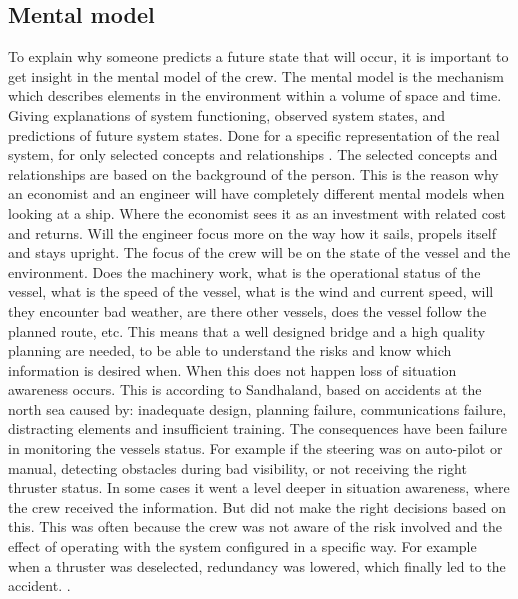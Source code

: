 \subsection{Mental model}
To explain why someone predicts a future state that will occur, it is important to get insight in the mental model of the crew.
The mental model is the mechanism which describes elements in the environment within a volume of space and time. Giving explanations of system functioning, observed system states, and predictions of future system states. Done for a specific representation of the real system, for only selected concepts and relationships \cite{Kalloniatis2017}. 
The selected concepts and relationships are based on the background of the person. This is the reason why an economist and an engineer will have completely different mental models when looking at a ship. Where the economist sees it as an investment with related cost and returns. Will the engineer focus more on the way how it sails, propels itself and stays upright. 
The focus of the crew will be on the state of the vessel and the environment. Does the machinery work, what is the operational status of the vessel, what is the speed of the vessel, what is the wind and current speed, will they encounter bad weather, are there other vessels, does the vessel follow the planned route, etc. This means that a well designed bridge and a high quality planning are needed, to be able to understand the risks and know which information is desired when. 
When this does not happen loss of situation awareness occurs. This is according to Sandhaland, based on accidents at the north sea caused by: inadequate design, planning failure, communications failure, distracting elements and insufficient training. 
The consequences have been failure in monitoring the vessels status. For example if the steering was on auto-pilot or manual, detecting obstacles during bad visibility, or not receiving the right thruster status. In some cases it went a level deeper in situation awareness, where the crew received the information. But did not make the right decisions based on this. This was often because the crew was not aware of the risk involved and the effect of operating with the system configured in a specific way. For example when a thruster was deselected, redundancy was lowered, which finally led to the accident. \cite{Sandhaland2015}.

